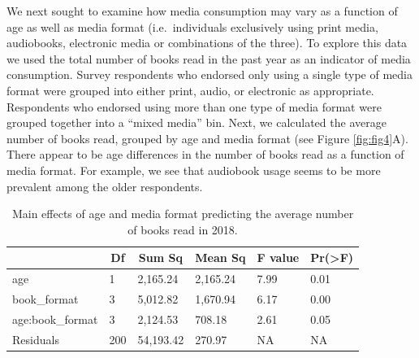 \documentclass[man, fleqn, noextraspace]{apa6}
\theoremstyle{definition}
\theoremstyle{definition}
\theoremstyle{definition}
\theoremstyle{remark}
\begin{document}
We next sought to examine how media consumption may vary as a function
of age as well as media format (i.e.~individuals exclusively using print
media, audiobooks, electronic media or combinations of the three). To
explore this data we used the total number of books read in the past
year as an indicator of media consumption. Survey respondents who
endorsed only using a single type of media format were grouped into
either print, audio, or electronic as appropriate. Respondents who
endorsed using more than one type of media format were grouped together
into a \enquote{mixed media} bin. Next, we calculated the average number
of books read, grouped by age and media format (see Figure
\ref{fig:fig4}A). There appear to be age differences in the number of
books read as a function of media format. For example, we see that
audiobook usage seems to be more prevalent among the older respondents.

\begin{table}[tbp]
\begin{center}
\begin{threeparttable}
\caption{\label{tab:tab2}Main effects of age and media format predicting the average number of books read in 2018.}
\begin{tabular}{llllll}
\toprule
 & \multicolumn{1}{c}{Df} & \multicolumn{1}{c}{Sum Sq} & \multicolumn{1}{c}{Mean Sq} & \multicolumn{1}{c}{F value} & \multicolumn{1}{c}{Pr(>F)}\\
\midrule
age & 1 & 2,165.24 & 2,165.24 & 7.99 & 0.01\\
book\_format & 3 & 5,012.82 & 1,670.94 & 6.17 & 0.00\\
age:book\_format & 3 & 2,124.53 & 708.18 & 2.61 & 0.05\\
Residuals & 200 & 54,193.42 & 270.97 & NA & NA\\
\bottomrule
\end{tabular}
\end{threeparttable}
\end{center}
\end{table}
\end{document}
